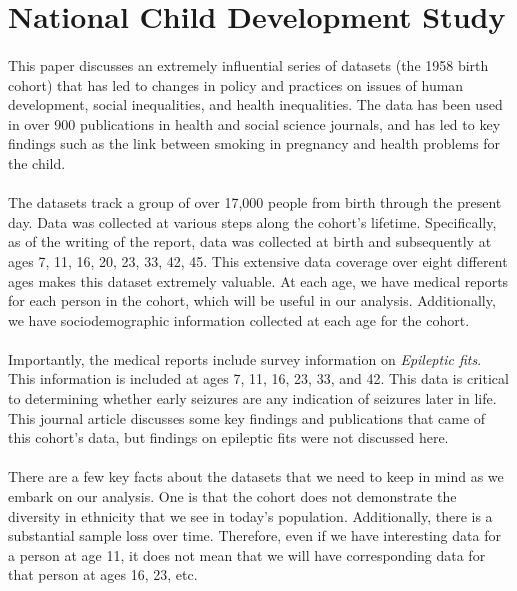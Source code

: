 \documentclass[10pt,letter]{article}
\begin{document}
\section{National Child Development Study}

\paragraph{} This paper discusses an extremely influential series of datasets (the 1958 birth cohort) that has led to changes in policy and practices on issues of human development, social inequalities, and health inequalities. The data has been used in over 900 publications in health and social science journals, and has led to key findings such as the link between smoking in pregnancy and health problems for the child.

\paragraph{} The datasets track a group of over 17,000 people from birth through the present day. Data was collected at various steps along the cohort's lifetime. Specifically, as of the writing of the report, data was collected at birth and subsequently at ages 7, 11, 16, 20, 23, 33, 42, 45. This extensive data coverage over eight different ages makes this dataset extremely valuable. At each age, we have medical reports for each person in the cohort, which will be useful in our analysis. Additionally, we have sociodemographic information collected at each age for the cohort.

\paragraph{} Importantly, the medical reports include survey information on \textit{Epileptic fits}. This information is included at ages 7, 11, 16, 23, 33, and 42. This data is critical to determining whether early seizures are any indication of seizures later in life. This journal article discusses some key findings and publications that came of this cohort's data, but findings on epileptic fits were not discussed here.

\paragraph{} There are a few key facts about the datasets that we need to keep in mind as we embark on our analysis. One is that the cohort does not demonstrate the diversity in ethnicity that we see in today's population. Additionally, there is a substantial sample loss over time. Therefore, even if we have interesting data for a person at age 11, it does not mean that we will have corresponding data for that person at ages 16, 23, etc.
\end{document}
